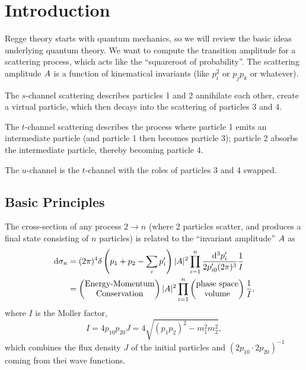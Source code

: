 \chapter{Introduction}


\M
Regge theory starts with quantum mechanics, so we will review the basic
ideas underlying quantum theory. We want to compute the transition
amplitude for a scattering process, which acts like the ``squareroot of
probability''. The scattering amplitude $A$ is a function of
kinematical invariants (like $p_{i}^{2}$ or $p_{j}p_{k}$ or whatever).

The $s$-channel scattering describes particles 1 and 2 annihilate each
other, create a virtual particle, which then decays into the scattering
of particles 3 and 4.

The $t$-channel scattering describes the process where particle 1 emits
an intermediate particle (and particle 1 then becomes particle 3);
particle 2 absorbs the intermediate particle, thereby becoming particle
4.

The $u$-channel is the $t$-channel with the roles of particles 3 and 4 
swapped.
\section{Basic Principles}

\M
The cross-section of any process $2\to n$ (where 2 particles scatter,
and produces a final state consisting of $n$ particles) is related to
the ``invariant amplitude'' $A$ as
\begin{equation}
  \begin{split}
\mathrm{d}\sigma_{n} &= (2\pi)^{4}\delta\left(p_{1}+p_{2}-\sum_{i}p_{i}'\right)|A|^{2}
\prod^{n}_{i=1}\frac{\mathrm{d}^{3}p'_{i}}{2p'_{i0}(2\pi)^{3}}\frac{1}{I}\\
&=\begin{pmatrix}\mbox{Energy-Momentum}\\
\mbox{Conservation}
\end{pmatrix}|A|^{2}\prod^{n}_{i=1}\begin{pmatrix}\mbox{phase space}\\
\mbox{volume}
\end{pmatrix}\frac{1}{I},
  \end{split}
  \end{equation}
where $I$ is the Moller factor,
\begin{equation}
I = 4p_{10}p_{20}J = 4\sqrt{(p_{1}p_{2})^{2} - m_{1}^{2}m_{2}^{2}},
\end{equation}
which combines the flux density $J$ of the initial particles and
$(2p_{10}\cdot2p_{20})^{-1}$ coming from thei wave functions.

